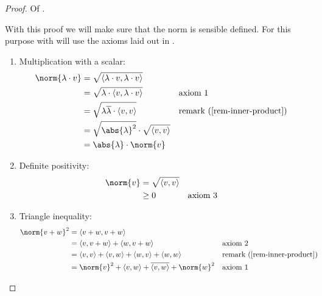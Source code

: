 \begin{proof}
	Of .
	\begin{flushleft}
		With this proof we will make sure that the norm is sensible defined. For
		this purpose with will use the axioms laid out in .
		\begin{enumerate}
			\item Multiplication with a scalar:
			      \begin{align*}
				      \norm{\lambda\cdot v} & = \sqrt{\left<\lambda\cdot v, \lambda\cdot v\right>}                                                 \\
				                            & = \sqrt{\lambda\cdot \left<v,\lambda\cdot v\right>}     &  & \text{axiom 1}                          \\
				                            & = \sqrt{\lambda\overline{\lambda}\cdot\left<v,v\right>} &  & \text{\pref{remark}{rem-inner-product}} \\
				                            & = \sqrt{\abs{\lambda}^2}\cdot\sqrt{\left<v,v\right>}                                                 \\
				                            & = \abs{\lambda}\cdot\norm{v}
			      \end{align*}
			\item Definite positivity:
			      \begin{align*}
				      \norm{v} & = \sqrt{\left<v,v\right>}                     \\
				               & \geq 0                    &  & \text{axiom 3}
			      \end{align*}
			\item Triangle inequality:
			      \begin{align*}
				      \norm{v+w}^2 & = \left<v+w,v+w\right>                                                                                                               \\
				                   & = \left<v,v+w\right> + \left<w,v+w\right>                                   &  & \text{axiom 2}                                      \\
				                   & = \left<v,v\right> + \left<v,w\right> + \left<w,v\right> + \left<w,w\right> &  & \text{\pref{remark}{rem-inner-product}}             \\
				                   & = \norm{v}^2 + \left<v,w\right> + \overline{\left<v,w\right>} + \norm{w}^2  &  & \text{axiom 1}                                      \\

\end{align*}
\end{enumerate}
\end{flushleft}
\end{proof}
